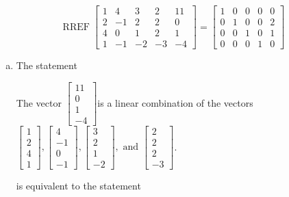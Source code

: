 \begin{exerciseAnswer} 
\[\operatorname{RREF}  \left[\begin{array}{cccc|c}
1 & 4 & 3 & 2 & 11 \\
2 & -1 & 2 & 2 & 0 \\
4 & 0 & 1 & 2 & 1 \\
1 & -1 & -2 & -3 & -4
\end{array}\right] = \left[\begin{array}{cccc|c}
1 & 0 & 0 & 0 & 0 \\
0 & 1 & 0 & 0 & 2 \\
0 & 0 & 1 & 0 & 1 \\
0 & 0 & 0 & 1 & 0
\end{array}\right] \]
\begin{enumerate}[(a)]
\item  The statement 
\begin{center}\begin{minipage}{0.8\textwidth}
 The vector \( \left[\begin{array}{c}
11 \\
0 \\
1 \\
-4
\end{array}\right] \)is a linear combination of the vectors \( \left[\begin{array}{c}
1 \\
2 \\
4 \\
1
\end{array}\right] , \left[\begin{array}{c}
4 \\
-1 \\
0 \\
-1
\end{array}\right] , \left[\begin{array}{c}
3 \\
2 \\
1 \\
-2
\end{array}\right] , \text{ and } \left[\begin{array}{c}
2 \\
2 \\
2 \\
-3
\end{array}\right] \). 
\end{minipage}\end{center}
     is equivalent to the statement 
\begin{center}\begin{minipage}{0.8\textwidth}

\end{minipage}
\end{center}
\end{enumerate}
\end{exerciseAnswer}
